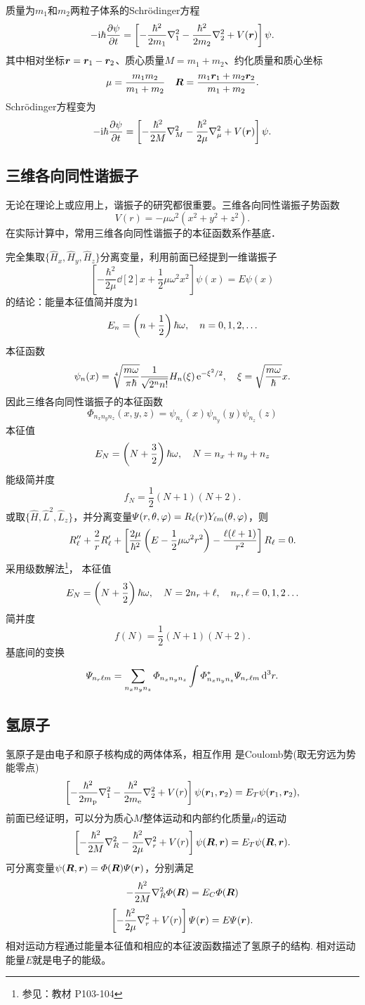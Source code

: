 质量为$m_1$和$m_2$两粒子体系的Schrödinger方程
\[-\mathrm{i}\hbar\frac{\partial^{\;\!\!}\psi}{\partial t^{\;\!\!}}=\left[-\frac{\hbar^2}{2m_1}\nabla_1^2-\frac{\hbar^2}{2m_2}\nabla_2^2+V(\bm r)\right]\psi.\]
其中相对坐标$\bm r=\bm r_1-\bm r_2$、质心质量$M=m_1+m_2$、约化质量和质心坐标
\[\mu=\frac{m_1m_2}{m_1+m_2}\quad\bm R=\frac{m_1\bm r_1+m_2\bm r_2}{m_1+m_2}.\]
Schrödinger方程变为
\[-\mathrm{i}\hbar\frac{\partial^{\;\!\!}\psi}{\partial t^{\;\!\!}}=\left[-\frac{\hbar^2}{2M}\nabla_M^2-\frac{\hbar^2}{2\mu}\nabla_\mu^2+V(\bm r)\right]\psi.\]
\subsection{三维各向同性谐振子}
无论在理论上或应用上，谐振子的研究都很重要。三维各向同性谐振子势函数
\[V(r)=-\mu\omega^2(x^2 +y^2 +z^2).\]
在实际计算中，常用三维各向同性谐振子的本征函数系作基底．

完全集取$\{\hat H_x,\hat H_y,\hat H_z\}$分离变量，利用前面已经提到一维谐振子
\[\left[-\frac{\hbar^{2}}{2 \mu}\dd[2]x+\frac{1}{2} \mu \omega^{2} x^{2}\right] \psi(x)=E \psi(x)\]
的结论：能量本征值简并度为1
\[E_{n}=\left(n+\frac12\right)\hbar \omega, \quad n=0,1,2, \ldots\]
本征函数
\[\psi_n(x)=\sqrt[4]{\frac{m\omega}{\pi\hbar}}\frac1{\sqrt{2^nn!}}H_n(\xi)\mathop{}\!\mathrm{e}^{-\xi^2/2},\quad\xi=\sqrt{\frac{m\omega}\hbar}x.\]
因此三维各向同性谐振子的本征函数
\[\varPhi_{n_xn_yn_z}(x,y,z)=\psi_{n_x}(x)\psi_{n_y}(y)\psi_{n_z}(z)\]
本征值 
\[E_N=\left(N+\frac32\right)\hbar\omega,\quad N=n_x+n_y+n_z\]
能级简并度
\[f_N=\frac12(N+1)(N+2).\]
或取$\{\hat H,\hat L^2,\hat L_z\}$，并分离变量$\varPsi(r,\theta,\varphi)=R_\ell(r)Y_{\ell m}(\theta,\varphi)$，则
\[R_\ell''+\frac2rR_\ell'+\left[\frac{2\mu}{\hbar^2}\left(E-\frac12\mu\omega^2r^2\right)-\frac{\ell(\ell+1)}{r^2}\right]R_\ell=0.\]
采用级数解法\footnote{参见：教材 P103-104}，
本征值
\[E_N=\left(N+\frac32\right)\hbar\omega,\quad N=2n_r+\ell,\quad n_r,\ell=0,1,2\ldots\]
简并度
\[f(N)=\frac12(N+1)(N+2).\]
基底间的变换
\[\varPsi_{n_r\ell m}=\sum_{n_xn_yn_z}\varPhi_{n_xn_yn_z}\int\varPhi_{n_xn_yn_z}^\ast\varPsi_{n_r\ell m}\mathop{}\!\mathrm{d}^3r.\]
\subsection{氢原子}
氢原子是由电子和原子核构成的两体体系，相互作用
是Coulomb势(取无穷远为势能零点)
\[\left[-\frac{\hbar^2}{2m_\mathrm p}\nabla_1^2-\frac{\hbar^2}{2m_\mathrm e}\nabla_2^2+V(r)\right]\psi(\bm r_1,\bm r_2)=E_T\psi(\bm r_1,\bm r_2),\]
前面已经证明，可以分为质心$M$整体运动和内部约化质量$\mu$的运动
\[\left[-\frac{\hbar^2}{2M}\nabla_R^2-\frac{\hbar^2}{2\mu}\nabla_r^2+V(r)\right]\psi(\bm R,\bm r)=E_T\psi(\bm R,\bm r).\]
可分离变量$\psi(\bm R,\bm r)=\varPhi(\bm R)\varPsi(\bm r)$，分别满足
\[-\frac{\hbar^2}{2M}\nabla_R^2\varPhi(\bm R)=E_C\varPhi(\bm R)\]
\[\left[-\frac{\hbar^2}{2\mu}\nabla_r^2+V(r)\right]\varPsi(\bm r)=E\varPsi(\bm r).\]
相对运动方程通过能量本征值和相应的本征波函数描述了氢原子的结构. 相对运动能量$E$就是电子的能级。

